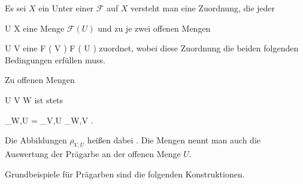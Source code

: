 {}
{





Es sei $X$ ein
Unter einer
${ \mathcal F  }$ auf $X$ versteht man eine Zuordnung, die jeder

\mavergleichskette
{\vergleichskette
{U
}
{ \subseteq }{ X
}
{  }{
}
{    }{
}
{   }{
}
}
{}{}{}
eine Menge ${ \mathcal  F   }  \left(   U   \right)$ und zu je zwei offenen Mengen

\mavergleichskette
{\vergleichskette
{U
}
{ \subseteq }{V
}
{  }{
}
{    }{
}
{   }{
}
}
{}{}{}
eine
 { { \mathcal  F   }  \left(   V   \right)   } { { \mathcal  F   }  \left(   U   \right)
} {}
zuordnet, wobei diese Zuordnung die beiden folgenden Bedingungen erfüllen muss.
 {Zu offenen Mengen

\mavergleichskettedisp
{\vergleichskette
{U
}
{ \subseteq} { V
}
{ \subseteq} { W
}
{ } {
}
{ } {
}
}
{}{}{}
ist stets

\mavergleichskettedisp
{\vergleichskette
{ \rho_{W,U}
}
{ =} { \rho_{V,U} \circ  \rho_{W,V}
}
{ } {
}
{ } {
}
{ } {
}
}
{}{}{.}
}





}

Die Abbildungen $\rho_{V,U}$ heißen dabei  {.} Die Mengen
 nennt man auch die Auswertung der Prägarbe an der offenen Menge $U$.

Grundbeispiele für Prägarben
 {} {}
sind die folgenden Konstruktionen.

